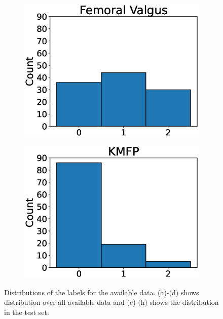 \begin{figure}
\begin{subfigure}[t]{0.24\textwidth}
    \includegraphics[width=\textwidth]{files/figs/met/femval-test-labels.eps}
    \caption{}
    \label{fig:femval-labels-test}
  \end{subfigure}
  \begin{subfigure}[t]{0.24\textwidth}
    \includegraphics[width=\textwidth]{files/figs/met/kmfp-test-labels.eps}
    \caption{}
    \label{fig:kmfp-labels-test}
  \end{subfigure}

  \caption{Distributions of the labels for the available data. (a)-(d) shows distribution over all available data and (e)-(h) shows the distribution in the test set.}
  \label{fig:label-dist}
\end{figure}


